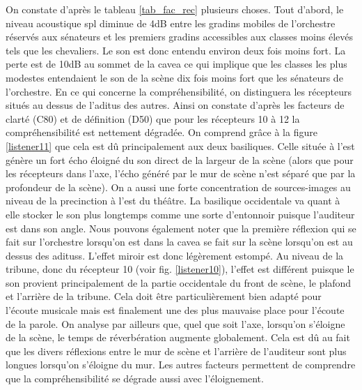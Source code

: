  
On constate d'après le tableau \ref{tab_fac_rec} plusieurs choses. Tout d'abord, le niveau acoustique \gls{spl} diminue de 4dB entre les gradins mobiles de l'orchestre réservés aux sénateurs et les premiers gradins accessibles aux classes moins élevés tels que les chevaliers. Le son est donc entendu environ deux fois moins fort. La perte est de 10dB au sommet de la \gls{cavea} ce qui implique que les classes les plus modestes entendaient le son de la scène dix fois moins fort que les sénateurs de l'orchestre. En ce qui concerne la compréhensibilité, on distinguera les récepteurs situés au dessus de l'\gls{aditus} des autres. Ainsi on constate d'après les facteurs de clarté (\gls{C80}) et de définition (\gls{D50}) que pour les récepteurs 10 à 12 la compréhensibilité est nettement dégradée. On comprend grâce à la figure \ref{listener11} que cela est dû principalement aux deux \glspl{basilique}. Celle située à l'est génère un fort écho éloigné du son direct de la largeur de la scène (alors que pour les récepteurs dans l'axe, l'écho généré par le mur de scène n'est séparé que par la profondeur de la scène). On a aussi une forte concentration de sources-images au niveau de la \gls{precinction} à l'est du théâtre. La basilique occidentale va quant à elle stocker le son plus longtemps comme une sorte d'entonnoir puisque l'auditeur est dans son angle. Nous pouvons également noter que la première réflexion qui se fait sur l'orchestre lorsqu'on est dans la \gls{cavea} se fait sur la scène lorsqu'on est au dessus des \glspl{aditus}. L'effet miroir est donc légèrement estompé. Au niveau de la tribune, donc du récepteur 10 (voir fig. \ref{listener10}), l'effet est différent puisque le son provient principalement de la partie occidentale du front de scène, le plafond et l'arrière de la tribune. Cela doit être particulièrement bien adapté pour l'écoute musicale mais est finalement une des plus mauvaise place pour l'écoute de la parole.
On analyse par ailleurs que, quel que soit l'axe, lorsqu'on s'éloigne de la scène, le temps de réverbération augmente globalement. Cela est dû au fait que les divers réflexions entre le mur de scène et l'arrière de l'auditeur sont plus longues lorsqu'on s'éloigne du mur. Les autres facteurs permettent de comprendre que la compréhensibilité se dégrade aussi avec l'éloignement. 
